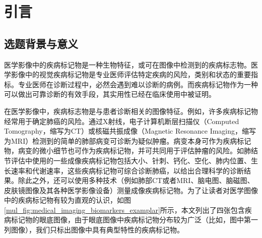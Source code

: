 \chapter{引言}\label{cha:introduction}
\section{选题背景与意义}
\label{sec:background}
医学影像中的疾病标记物是一种生物特征，或可在图像中检测到的疾病标志物。医学影像中的视觉疾病标记物是专业医师评估特定疾病的风险，类别和状态的重要指标。专业医师在诊断过程中，必然会遇到难以诊断的病例。而疾病标记物作为一种可以做出可靠诊断的有效手段，其实用性已经在临床使用中被证明。

在医学影像中，疾病标志物是与患者诊断相关的图像特征。例如，许多疾病标记物经常用于确定肺癌的风险。通过X射线，电子计算机断层扫描仪（Computed Tomography，缩写为CT）或核磁共振成像（Magnetic Resonance Imaging，缩写为MRI）检测到的简单的肺部病变可诊断为疑似肿瘤。病变本身可作为疾病标记物，病变的微小细节也可作为疾病标记物，并可共同用于评估肿瘤的风险。如肺结节评估中使用的一些成像疾病标记物包括大小、针刺、钙化、空化、肺内位置、生长速率和代谢速率，这些疾病标记物可综合诊断肺癌，以给出合理科学的诊断结果。除此之外，还可以使用多种技术（例如肺部CT或者MRI、脑电图、脑磁图、皮肤镜图像及其各种医学影像设备）测量成像疾病标记物。为了让读者对医学图像中的疾病标记物有较为直观的认识，如图\ref{mul_fig:medical_imaging_biomarkers_examplar}所示，本文列出了四张包含疾病标记物的眼底图像，由于眼底图像中疾病标记物分布较为广泛（比如，图中第一列图像），我们只标出图像中具有典型特性的疾病标记物。



